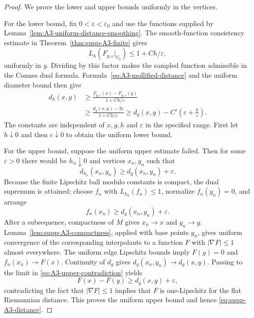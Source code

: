 \documentclass[11pt]{article}
\theoremstyle{definition}
\theoremstyle{remark}
\theoremstyle{definition}
\theoremstyle{remark}
\begin{document}
\begin{proof}
We prove the lower and upper bounds uniformly in the vertices.

For the lower bound, fix $0<\varepsilon<\varepsilon_0$ and use the
functions supplied by Lemma~\ref{lem:A3-uniform-distance-smoothing}.
The smooth-function consistency estimate in
Theorem~\ref{thm:supp-A3-finite} gives
\[
 L_h(F_{y,\varepsilon}|_{V_h})\le1+C h/\varepsilon,
\]
uniformly in $y$.  Dividing by this factor makes the sampled function
admissible in the Connes dual formula.  Formula~\eqref{eq:A3-mollified-distance}
and the uniform diameter bound then give
\begin{equation}
 \begin{split}
 d_h(x,y)
 &\ge\frac{F_{y,\varepsilon}(x)-F_{y,\varepsilon}(y)}
              {1+C h/\varepsilon}\\
 &\ge\frac{d_g(x,y)-2\varepsilon}{1+C h/\varepsilon}
 \ge d_g(x,y)-C'\left(\varepsilon+\frac h\varepsilon\right).
 \end{split}
 \label{eq:A3-uniform-distance-lower-bound}
\end{equation}
The constants are independent of $x,y,h$ and $\varepsilon$ in the
specified range.  First let $h\downarrow0$ and then
$\varepsilon\downarrow0$ to obtain the uniform lower bound.

For the upper bound, suppose the uniform upper estimate failed.  Then for some
$\varepsilon>0$ there would be $h_n\downarrow0$ and vertices $x_n,y_n$ such that
\[
 d_{h_n}(x_n,y_n)\ge d_g(x_n,y_n)+\varepsilon.
\]
Because the finite Lipschitz ball modulo constants is compact, the dual supremum is
attained; choose $f_n$ with $L_{h_n}(f_n)\le1$, normalize
$f_n(y_n)=0$, and arrange
\begin{equation}
 f_n(x_n)\ge d_g(x_n,y_n)+\varepsilon.
 \label{eq:A3-upper-contradiction}
\end{equation}
After a subsequence, compactness of $M$ gives $x_n\to x$ and $y_n\to y$.
Lemma~\ref{lem:supp-A3-compactness}, applied with base points $y_n$, gives
uniform convergence of the corresponding interpolants to a function $F$ with
$|\nabla F|\le1$ almost everywhere.  The uniform edge Lipschitz bounds imply
$F(y)=0$ and $f_n(x_n)\to F(x)$.  Continuity of $d_g$ gives
$d_g(x_n,y_n)\to d_g(x,y)$.  Passing to the limit in
\eqref{eq:A3-upper-contradiction} yields
\[
 F(x)-F(y)\ge d_g(x,y)+\varepsilon,
\]
contradicting the fact that $|\nabla F|\le1$ implies that $F$ is
one-Lipschitz for the flat Riemannian distance.  This proves the uniform upper
bound and hence \eqref{eq:supp-A3-distance}.
\end{proof}
\end{document}
